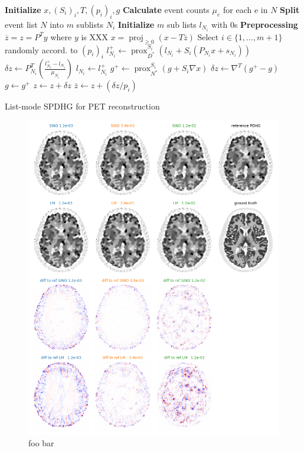 \documentclass{IEEEtran}
\DeclareMathOperator{\proj}{proj}
\DeclareMathOperator{\prox}{prox}
\begin{document}
\begin{algorithm}[t]
\begin{algorithmic}[1]
\footnotesize
\State \textbf{Initialize} $x,(S_i)_i,T,(p_i)_i,g$
\State \textbf{Calculate} event counts $\mu_e$ for each e in $N$
\State \textbf{Split} event list $N$ into $m$ sublists $N_i$
\State \textbf{Initialize} $m$ sub lists $l_{N_i}$ with 0s
\State \textbf{Preprocessing} $\overline{z} = z = P^T y$ where $y$ is XXX
\Repeat
	\State $x = \proj_{\geq 0} (x - T \overline{z})$
	\State Select $i \in \{1,\ldots,m+1\}$ randomly accord. to $(p_i)_i$
	  \State $l_{N_i}^+ \gets \prox_{D^*}^{S_i} \left( l_{N_i} + S_i \left(P_{N_i} x + s_{N_i} \right) \right)$
	  \State $\delta z \gets P_{N_i}^T \left(\frac{l_{N_i}^+ - l_{N_i}}{\mu_{N_i}}\right)$
	  \State $l_{N_i} \gets l_{N_i}^+$
  \Else
	  \State $g^+ \gets \prox_{N^*}^{S_i} \left( g + S_i \nabla x \right)$
	  \State $\delta z \gets \nabla^T \left(g^+ - g\right)$
	  \State $g \gets g^+$
  \EndIf
	\State $z \gets z + \delta z$
	\State $\overline{z} \gets  z + (\delta z/p_i)$
\State {}
\end{algorithmic}
\caption{List-mode SPDHG for PET reconstruction}
\label{alg:spdhg}
\end{algorithm}

\begin{figure}[t]
\centerline{\includegraphics[width=1.0\columnwidth]{./figs/brain2d_counts_1.0E+06_beta_2.0E-03_niter_5000_100_nsub_56_precond_False.png}}
\caption{foo bar}
\label{fig:recons}
\end{figure}
\end{document}
